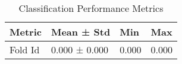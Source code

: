 
\begin{table}[htbp]
\centering
\caption{Classification Performance Metrics}
\label{tab:classification_results}
\begin{tabular}{llll}
\toprule
Metric & Mean ± Std & Min & Max \\
\midrule
Fold Id & 0.000 ± 0.000 & 0.000 & 0.000 \\
\bottomrule
\end{tabular}
\end{table}
